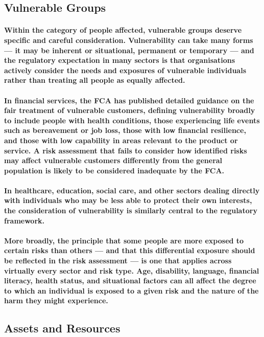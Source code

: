 \subsection{Vulnerable Groups}
\paragraph{Within the category of people affected, \textbf{vulnerable groups} deserve specific and careful consideration. Vulnerability can take many forms — it may be inherent or situational, permanent or temporary — and the regulatory expectation in many sectors is that organisations actively consider the needs and exposures of vulnerable individuals rather than treating all people as equally affected.}
\paragraph{In financial services, the FCA has published detailed guidance on the fair treatment of vulnerable customers, defining vulnerability broadly to include people with health conditions, those experiencing life events such as bereavement or job loss, those with low financial resilience, and those with low capability in areas relevant to the product or service. A risk assessment that fails to consider how identified risks may affect vulnerable customers differently from the general population is likely to be considered inadequate by the FCA.}
\paragraph{In healthcare, education, social care, and other sectors dealing directly with individuals who may be less able to protect their own interests, the consideration of vulnerability is similarly central to the regulatory framework.}
\paragraph{More broadly, the principle that some people are more exposed to certain risks than others — and that this differential exposure should be reflected in the risk assessment — is one that applies across virtually every sector and risk type. Age, disability, language, financial literacy, health status, and situational factors can all affect the degree to which an individual is exposed to a given risk and the nature of the harm they might experience.}

\subsection{Assets and Resources}
